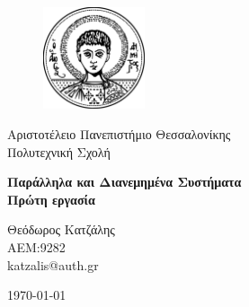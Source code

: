 \begin{titlepage}

\begin{figure}[h!]
  \begin{center}
    \includegraphics[width=3cm]{assets/auth.pdf}
    \label{fig:cover_auth_logo}
  \end{center}
\end{figure}

\centering
\Large Αριστοτέλειο Πανεπιστήμιο Θεσσαλονίκης\\
\Large Πολυτεχνική Σχολή\\

\vspace{\fill}

\LARGE \textbf{Παράλληλα και Διανεμημένα Συστήματα \\ Πρώτη εργασία}

\vspace{\fill}

\Large Θεόδωρος Κατζάλης \\
\Large ΑΕΜ:9282 \\ 
\Large katzalis@auth.gr

\vspace{\fill}
\raggedright

\centering
\vspace{\fill}
\today

\end{titlepage}
